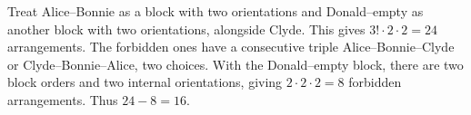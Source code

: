 Treat Alice--Bonnie as a block with two orientations and Donald--empty as another block with two orientations, alongside Clyde. This gives $3!\cdot2\cdot2=24$ arrangements. The forbidden ones have a consecutive triple Alice--Bonnie--Clyde or Clyde--Bonnie--Alice, two choices. With the Donald--empty block, there are two block orders and two internal orientations, giving $2\cdot2\cdot2=8$ forbidden arrangements. Thus $\boxed{24-8=16}$.
